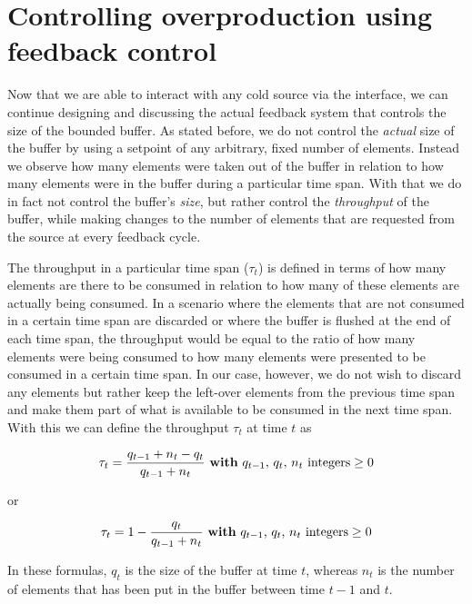 \section{Controlling overproduction using feedback control}
Now that we are able to interact with any cold source via the  interface, we can continue designing and discussing the actual feedback system that controls the size of the bounded buffer. As stated before, we do not control the \emph{actual} size of the buffer by using a setpoint of any arbitrary, fixed number of elements. Instead we observe how many elements were taken out of the buffer in relation to how many elements were in the buffer during a particular time span. With that we do in fact not control the buffer's \emph{size}, but rather control the \emph{throughput} of the buffer, while making changes to the number of elements that are requested from the source at every feedback cycle.

The throughput in a particular time span ($\tau_t$) is defined in terms of how many elements are there to be consumed in relation to how many of these elements are actually being consumed. In a scenario where the elements that are not consumed in a certain time span are discarded or where the buffer is flushed at the end of each time span, the throughput would be equal to the ratio of how many elements were being consumed to how many elements were presented to be consumed in a certain time span. In our case, however, we do not wish to discard any elements but rather keep the left-over elements from the previous time span and make them part of what is available to be consumed in the next time span. With this we can define the throughput $\tau_t$ at time $t$ as

\begin{equation}\label{eq:throughput-fraction}
\tau_t = \frac{q_{t-1} + n_t - q_t }{q_{t-1} + n_t} \text{ \textbf{with} }q_{t-1}\text{, }q_t\text{, }n_t\text{ integers} \geq 0
\end{equation}

or

\begin{equation}\label{eq:throughput-simple}
\tau_t = 1 - \frac{q_t}{q_{t-1} + n_t} \text{ \textbf{with} }q_{t-1}\text{, }q_t\text{, }n_t\text{ integers} \geq 0
\end{equation}

In these formulas, $q_t$ is the size of the buffer at time $t$, whereas $n_t$ is the number of elements that has been put in the buffer between time $t - 1$ and $t$.

